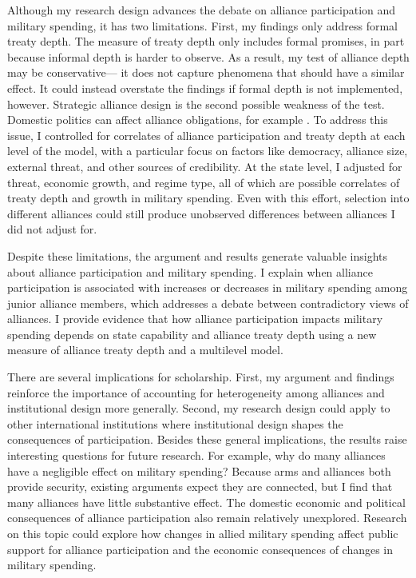 \documentclass[12pt]{article}
\begin{document}
Although my research design advances the debate on alliance participation and military spending, it has two limitations. 
First, my findings only address formal treaty depth. 
The measure of treaty depth only includes formal promises, in part because informal depth is harder to observe. 
As a result, my test of alliance depth may be conservative--- it does not capture phenomena that should have a similar effect. 
It could instead overstate the findings if formal depth is not implemented, however. 
Strategic alliance design is the second possible weakness of the test. 
Domestic politics can affect alliance obligations, for example \citep{Davis2004, Chibaetal2015}.   
To address this issue, I controlled for correlates of alliance participation and treaty depth at each level of the model, with a particular focus on factors like democracy, alliance size, external threat, and other sources of credibility.
At the state level, I adjusted for threat, economic growth, and regime type, all of which are possible correlates of treaty depth and growth in military spending. 
Even with this effort, selection into different alliances could still produce unobserved differences between alliances I did not adjust for. 


Despite these limitations, the argument and results generate valuable insights about alliance participation and military spending. 
I explain when alliance participation is associated with increases or decreases in military spending among junior alliance members, which addresses a debate between contradictory views of alliances.  
I provide evidence that how alliance participation impacts military spending depends on state capability and alliance treaty depth using a new measure of alliance treaty depth and a multilevel model. 


There are several implications for scholarship. 
First, my argument and findings reinforce the importance of accounting for heterogeneity among alliances and institutional design more generally.
Second, my research design could apply to other international institutions where institutional design shapes the consequences of participation.
Besides these general implications, the results raise interesting questions for future research. 
For example, why do many alliances have a negligible effect on military spending? 
Because arms and alliances both provide security, existing arguments expect they are connected, but I find that many alliances have little substantive effect.
The domestic economic and political consequences of alliance participation also remain relatively unexplored.
Research on this topic could explore how changes in allied military spending affect public support for alliance participation and the economic consequences of changes in military spending.  
\end{document}
